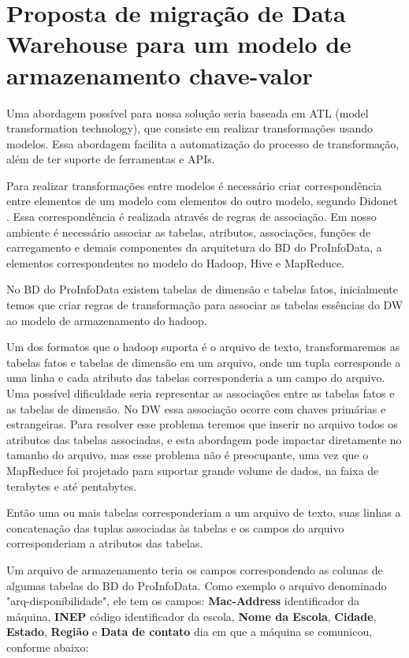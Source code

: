 \chapter{\textbf{Proposta de migração de Data Warehouse para um modelo 
            de armazenamento chave-valor}}

Uma abordagem possível para nossa solução seria baseada em ATL \cite{atl} (model
transformation technology), que consiste em realizar transformações usando modelos.
Essa abordagem facilita a automatização do processo de transformação, além de
ter suporte de ferramentas e APIs.

Para realizar transformações entre modelos é necessário criar correspondência
entre elementos de um modelo com elementos do outro modelo, segundo Didonet \cite{Didonet}.
Essa correspondência é realizada através de regras de associação. Em nosso
ambiente é necessário associar as tabelas, atributos, associações, funções de
carregamento e demais componentes da arquitetura do BD do ProInfoData, a
elementos correspondentes no modelo do Hadoop, Hive e MapReduce.

No BD do ProInfoData existem tabelas de dimensão e tabelas fatos, inicialmente
temos que criar regras de transformação para associar as tabelas essências do
DW ao modelo de armazenamento do hadoop.

Um dos formatos que o hadoop suporta é o arquivo de texto, transformaremos as
tabelas fatos e tabelas de dimensão em um arquivo, onde um tupla corresponde a
uma linha e cada atributo das tabelas corresponderia a um campo do arquivo. Uma
possível dificuldade seria representar as associações entre as tabelas fatos e
as tabelas de dimensão. No DW essa associação ocorre com chaves primárias e
estrangeiras. Para resolver esse problema teremos que inserir no arquivo todos
os atributos das tabelas associadas, e esta abordagem pode impactar diretamente no
tamanho do arquivo, mas esse problema não é preocupante, uma vez que o MapReduce
foi projetado para suportar grande volume de dados, na faixa de terabytes e até
pentabytes.

Então uma ou mais tabelas corresponderiam a um arquivo de texto, suas linhas a
concatenação das tuplas associadas às tabelas e os campos do arquivo
corresponderiam a atributos das tabelas.

Um arquivo de armazenamento teria os campos correspondendo as colunas de
algumas tabelas do BD do ProInfoData. Como exemplo o arquivo denominado
"arq-disponibilidade", ele tem os campos: \textbf{Mac-Address} identificador
da máquina, \textbf{INEP} código identificador da escola, \textbf{Nome da Escola},
\textbf{Cidade}, \textbf{Estado}, \textbf{Região} e \textbf{Data de contato} dia em
que a máquina se comunicou, conforme abaixo:

